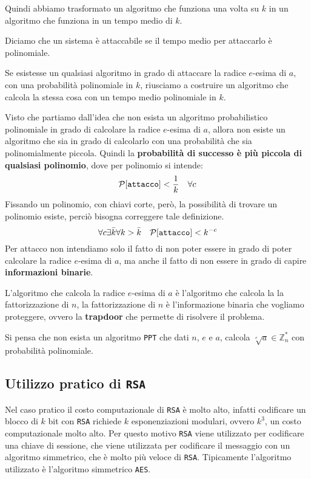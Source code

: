Quindi abbiamo trasformato un algoritmo che funziona una volta su $k$ in un algoritmo
che funziona in un tempo medio di $k$.
\begin{tcolorbox}[title=Definizione di sicurezza]
  Diciamo che un sistema è attaccabile se il tempo medio per attaccarlo è polinomiale.
\end{tcolorbox}
Se esistesse un qualsiasi algoritmo in grado di attaccare la radice $e$-esima di $a$,
con una probabilità polinomiale in $k$, riusciamo a costruire un algoritmo che calcola
la stessa cosa con un tempo medio polinomiale in $k$.

Visto che partiamo  dall'idea che non esista un algoritmo probabilistico polinomiale 
in grado di calcolare la radice $e$-esima di $a$, allora non esiste un algoritmo
che sia in grado di calcolarlo con una probabilità che sia polinomialmente piccola.
Quindi la \textbf{probabilità di successo è più piccola di qualsiasi polinomio}, dove per polinomio 
si intende:
\[
  \text{$\mathcal{P}$}[\texttt{attacco}] < \frac{1}{k}\quad \forall c
\]
Fissando un polinomio, con chiavi corte, però, la possibilità di trovare un polinomio esiste, 
perciò bisogna correggere tale definizione.
\begin{equation}
  \forall c \exists \bar{k} \forall k > \bar{k}\quad\text{$\mathcal{P}$}[\texttt{attacco}] < k^{-c}
\end{equation}
Per attacco non intendiamo solo il fatto di non poter essere in grado di poter calcolare la 
radice $e$-esima di $a$, ma anche il fatto di non essere in grado di capire 
\textbf{informazioni binarie}.

L'algoritmo che calcola la radice $e$-esima di $a$ è l'algoritmo che calcola la
la fattorizzazione di $n$, la fattorizzazione di $n$ è l'informazione 
binaria che vogliamo proteggere, ovvero la \textbf{trapdoor} che permette di risolvere 
il problema.
\begin{tcolorbox}[title=Fattorizzazione di $n$]
  Si pensa che non esista un algoritmo \texttt{PPT} che dati $n$, $e$ e $a$,
  calcola $\sqrt[e]{a} \in \mathbb{Z}_n^*$ con probabilità polinomiale.
\end{tcolorbox}
\subsection{Utilizzo pratico di \texttt{RSA}}

Nel caso pratico il costo computazionale di \texttt{RSA} è molto alto, infatti codificare 
un blocco di $k$ bit con \texttt{RSA} richiede $k$ esponenziazioni modulari, ovvero $k^3$, 
un costo computazionale molto alto. Per questo motivo \texttt{RSA} viene utilizzato per
codificare una chiave di sessione, che viene utilizzata per codificare
il messaggio con un algoritmo simmetrico, che è molto più veloce di \texttt{RSA}.
Tipicamente l'algoritmo utilizzato è l'algoritmo simmetrico \texttt{AES}.

